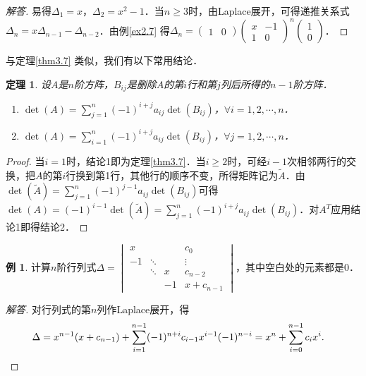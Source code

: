 \documentclass[a4paper,fontset=windows]{ctexbook}
\newtheorem{theorem}{定理}[chapter]
\theoremstyle{definition}
\newtheorem{example}{例}[chapter]
\renewcommand{\ge}{\geqslant}
\begin{document}
\begin{proof}[解答]
易得$\Delta_1=x$，$\Delta_2=x^2-1$．当$n\ge 3$时，由Laplace展开，可得递推关系式$\Delta_n=x\Delta_{n-1}-\Delta_{n-2}$．由例\ref{ex2.7} 得$\Delta_n=\begin{pmatrix}1 & 0\end{pmatrix}\begin{pmatrix}x&-1 \\ 1&0\end{pmatrix}^n\begin{pmatrix}1 \\ 0\end{pmatrix}$．
\end{proof}

与定理\ref{thm3.7} 类似，我们有以下常用结论．

\begin{theorem}\label{thm3.8}
设$A$是$n$阶方阵，$B_{ij}$是删除$A$的第$i$行和第$j$列后所得的$n-1$阶方阵．
\begin{enumerate}
\item $\det(A)=\sum\limits_{j=1}^n(-1)^{i+j}a_{ij}\det(B_{ij})$，$\forall i=1,2,\cdots,n$．

\item $\det(A)=\sum\limits_{i=1}^n(-1)^{i+j}a_{ij}\det(B_{ij})$，$\forall j=1,2,\cdots,n$．
\end{enumerate}
\end{theorem}

\begin{proof}
当$i=1$时，结论1即为定理\ref{thm3.7}．当$i\ge 2$时，可经$i-1$次相邻两行的交换，把$A$的第$i$行换到第1行，其他行的顺序不变，所得矩阵记为$\widetilde{A}$．由$\det(\widetilde{A})=\sum\limits_{j=1}^n(-1)^{j-1}a_{ij}\det(B_{ij})$可得$\det(A)=(-1)^{i-1}\det(\widetilde{A})=\sum\limits_{j=1}^n(-1)^{i+j}a_{ij}\det(B_{ij})$．对$A^T$应用结论1即得结论2．
\end{proof}

\begin{example}
计算$n$阶行列式$\Delta=\begin{vmatrix}x&&&c_0 \\ -1&\ddots&&\vdots \\ &\ddots&x&c_{n-2} \\ &&-1&x+c_{n-1}\end{vmatrix}$，其中空白处的元素都是0．
\end{example}

\begin{proof}[解答]
对行列式的第$n$列作Laplace展开，得
\begin{align*}
&\Delta=x^{n-1}(x+c_{n-1})+\sum\limits_{i=1}^{n-1}(-1)^{n+i}c_{i-1}x^{i-1}(-1)^{n-i}=x^n+\sum_{i=0}^{n-1}c_ix^i. \qedhere
\end{align*}
\end{proof}
\end{document}
